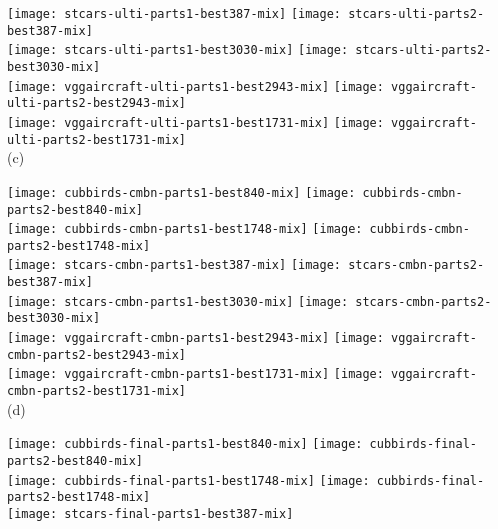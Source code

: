 \documentclass[10pt,twocolumn,letterpaper]{article}
\begin{document}
\begin{figure*}[t]
\begin{center}
\begin{minipage}{0.21\linewidth}
\texttt{[image: stcars-ulti-parts1-best387-mix]}
\texttt{[image: stcars-ulti-parts2-best387-mix]}\\
\texttt{[image: stcars-ulti-parts1-best3030-mix]}
\texttt{[image: stcars-ulti-parts2-best3030-mix]}\\
\texttt{[image: vggaircraft-ulti-parts1-best2943-mix]}
\texttt{[image: vggaircraft-ulti-parts2-best2943-mix]}\\
\texttt{[image: vggaircraft-ulti-parts1-best1731-mix]}
\texttt{[image: vggaircraft-ulti-parts2-best1731-mix]}\\
\centering (c)
\end{minipage}
\begin{minipage}{0.21\linewidth}
\texttt{[image: cubbirds-cmbn-parts1-best840-mix]}
\texttt{[image: cubbirds-cmbn-parts2-best840-mix]}\\
\texttt{[image: cubbirds-cmbn-parts1-best1748-mix]}
\texttt{[image: cubbirds-cmbn-parts2-best1748-mix]}\\
\texttt{[image: stcars-cmbn-parts1-best387-mix]}
\texttt{[image: stcars-cmbn-parts2-best387-mix]}\\
\texttt{[image: stcars-cmbn-parts1-best3030-mix]}
\texttt{[image: stcars-cmbn-parts2-best3030-mix]}\\
\texttt{[image: vggaircraft-cmbn-parts1-best2943-mix]}
\texttt{[image: vggaircraft-cmbn-parts2-best2943-mix]}\\
\texttt{[image: vggaircraft-cmbn-parts1-best1731-mix]}
\texttt{[image: vggaircraft-cmbn-parts2-best1731-mix]}\\
\centering (d)
\end{minipage}
\begin{minipage}{0.21\linewidth}
\texttt{[image: cubbirds-final-parts1-best840-mix]}
\texttt{[image: cubbirds-final-parts2-best840-mix]}\\
\texttt{[image: cubbirds-final-parts1-best1748-mix]}
\texttt{[image: cubbirds-final-parts2-best1748-mix]}\\
\texttt{[image: stcars-final-parts1-best387-mix]}

\end{minipage}
\end{center}
\end{figure*}
\end{document}
